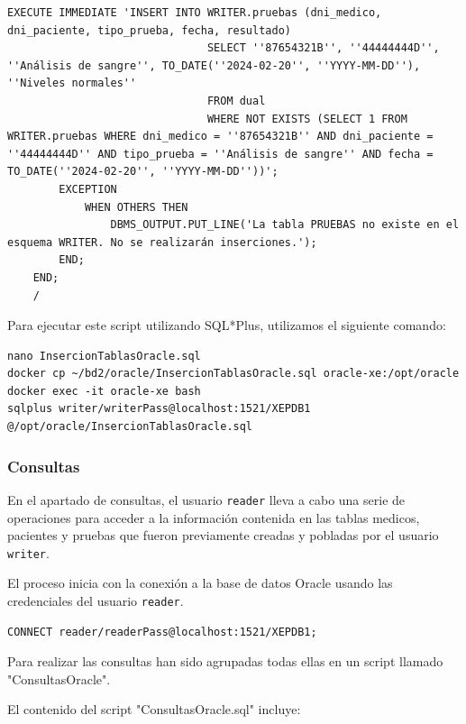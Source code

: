\documentclass{article}
\begin{document}
\begin{lstlisting}[style=bashStyle]
            EXECUTE IMMEDIATE 'INSERT INTO WRITER.pruebas (dni_medico, dni_paciente, tipo_prueba, fecha, resultado)
                               SELECT ''87654321B'', ''44444444D'', ''Análisis de sangre'', TO_DATE(''2024-02-20'', ''YYYY-MM-DD''), ''Niveles normales''
                               FROM dual
                               WHERE NOT EXISTS (SELECT 1 FROM WRITER.pruebas WHERE dni_medico = ''87654321B'' AND dni_paciente = ''44444444D'' AND tipo_prueba = ''Análisis de sangre'' AND fecha = TO_DATE(''2024-02-20'', ''YYYY-MM-DD''))';
        EXCEPTION
            WHEN OTHERS THEN
                DBMS_OUTPUT.PUT_LINE('La tabla PRUEBAS no existe en el esquema WRITER. No se realizarán inserciones.');
        END;
    END;
    /
\end{lstlisting}

Para ejecutar este script utilizando SQL*Plus, utilizamos el siguiente comando:

\begin{lstlisting}[style=bashStyle]
nano InsercionTablasOracle.sql
docker cp ~/bd2/oracle/InsercionTablasOracle.sql oracle-xe:/opt/oracle
docker exec -it oracle-xe bash
sqlplus writer/writerPass@localhost:1521/XEPDB1
@/opt/oracle/InsercionTablasOracle.sql
\end{lstlisting}

\subsubsection{Consultas}

En el apartado de consultas, el usuario \texttt{reader} lleva a cabo una serie de operaciones para acceder a la información contenida en las tablas medicos, pacientes y pruebas que fueron previamente creadas y pobladas por el usuario \texttt{writer}. 

El proceso inicia con la conexión a la base de datos Oracle usando las credenciales del usuario \texttt{reader}. 

\begin{lstlisting}[style=bashStyle]
CONNECT reader/readerPass@localhost:1521/XEPDB1;
\end{lstlisting}

Para realizar las consultas han sido agrupadas todas ellas en un script llamado "ConsultasOracle".

El contenido del script "ConsultasOracle.sql" incluye:
\end{document}
